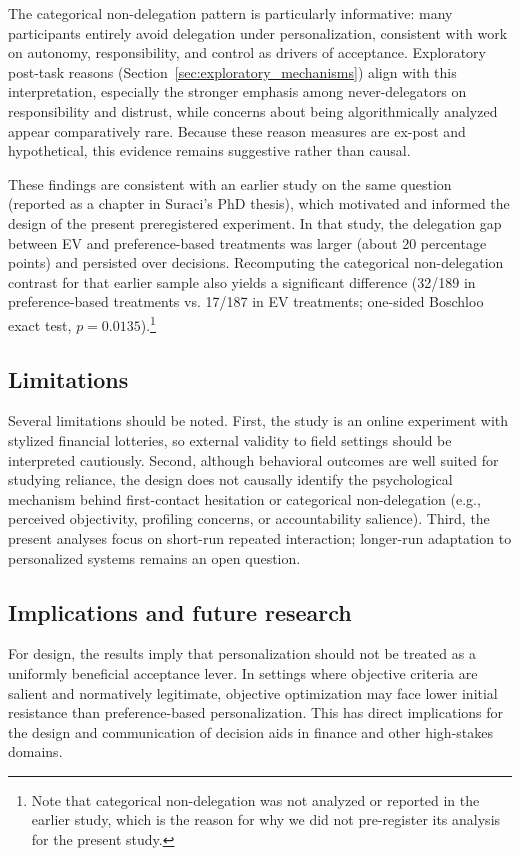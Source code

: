 \documentclass[a4paper, 12pt, fleqn]{article}
\theoremstyle{definition}
\begin{document}
The categorical non-delegation pattern is particularly informative: many participants entirely avoid delegation under personalization, consistent with work on autonomy, responsibility, and control as drivers of acceptance. Exploratory post-task reasons (Section~\ref{sec:exploratory_mechanisms}) align with this interpretation, especially the stronger emphasis among never-delegators on responsibility and distrust, while concerns about being algorithmically analyzed appear comparatively rare. Because these reason measures are ex-post and hypothetical, this evidence remains suggestive rather than causal.

These findings are consistent with an earlier study on the same question (reported as a chapter in Suraci's PhD thesis), which motivated and informed the design of the present preregistered experiment. In that study, the delegation gap between EV and preference-based treatments was larger (about 20 percentage points) and persisted over decisions. Recomputing the categorical non-delegation contrast for that earlier sample also yields a significant difference (32/189 in preference-based treatments vs. 17/187 in EV treatments; one-sided Boschloo exact test, $p = 0.0135$).\footnote{Note that categorical non-delegation was not analyzed or reported in the earlier study, which is the reason for why we did not pre-register its analysis for the present study.}

\subsection{Limitations}
Several limitations should be noted. First, the study is an online experiment with stylized financial lotteries, so external validity to field settings should be interpreted cautiously. Second, although behavioral outcomes are well suited for studying reliance, the design does not causally identify the psychological mechanism behind first-contact hesitation or categorical non-delegation (e.g., perceived objectivity, profiling concerns, or accountability salience). Third, the present analyses focus on short-run repeated interaction; longer-run adaptation to personalized systems remains an open question.

\subsection{Implications and future research}
For design, the results imply that personalization should not be treated as a uniformly beneficial acceptance lever. In settings where objective criteria are salient and normatively legitimate, objective optimization may face lower initial resistance than preference-based personalization. This has direct implications for the design and communication of decision aids in finance and other high-stakes domains.
\end{document}
